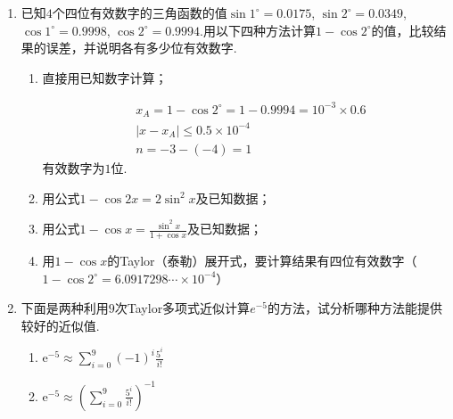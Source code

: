 \documentclass[a4paper]{article}
\begin{document}
\courseheader
{}

\begin{enumerate}
  \setlength{\itemsep}{3\parskip}

  \item 已知$4$个四位有效数字的三角函数的值$\sin 1^\circ =0.0175$, $\sin 2^\circ =0.0349$, $\cos 1 ^ \circ = 0.9998$, $\cos 2 ^\circ = 0.9994$.用以下四种方法计算$1 - \cos 2 ^ \circ$的值，比较结果的误差，并说明各有多少位有效数字.
  \begin{enumerate}[label=（\arabic*）]
    \item 直接用已知数字计算；
    \begin{solution}
      \begin{align*}
        &x_A=1 - \cos 2^\circ = 1 - 0.9994 = 10^{-3}\times0.6\\
        &\left |  x-x_A\right | \le 0.5\times10^{-4}\\
        &n=-3-(-4)=1
      \end{align*}
      有效数字为$1$位.
    \end{solution}
    \item 用公式$1-\cos 2x = 2 \sin^2 x$及已知数据；
    \begin{solution}
      
    \end{solution}
    \item 用公式$1-\cos x = \frac{\sin^2 x}{1+\cos x}$及已知数据；
    \begin{solution}
      
    \end{solution} 
    \item 用$1-\cos x$的Taylor（泰勒）展开式，要计算结果有四位有效数字（$1-\cos 2^\circ =6.0917298\cdots \times 10^{-4}$）
    \begin{solution}
      
    \end{solution}
  \end{enumerate}
  

  \item 下面是两种利用$9$次Taylor多项式近似计算$e^{-5}$的方法，试分析哪种方法能提供较好的近似值.
  \begin{enumerate}[label=（\arabic*）]
    \item $\mathrm{e}^{-5}\approx\sum_{i=0}^9\left(-1\right)^i\frac{5^i}{i!}$
    \item $\mathrm{e}^{-5}\approx\left(\sum_{i=0}^9\frac{5^i}{i!}\right)^{-1}$
  \end{enumerate}


\end{enumerate}
\end{document}
